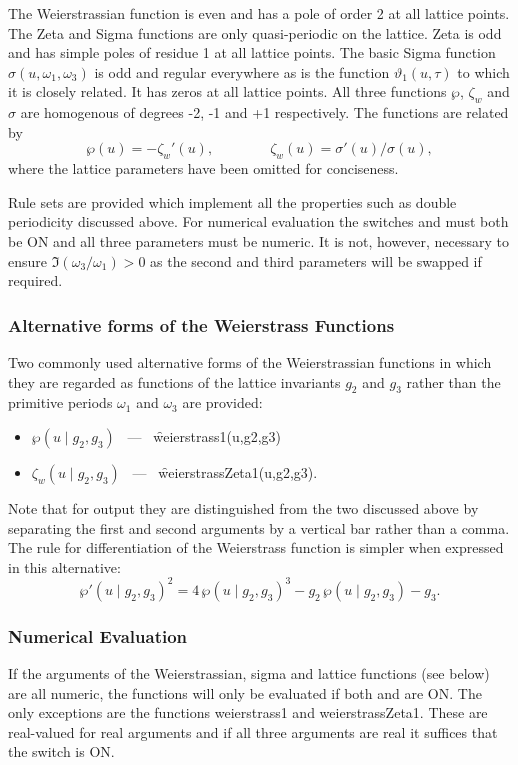 The Weierstrassian function is even and has a pole of order 2 at all lattice points.
The Zeta and Sigma functions are only quasi-periodic on the lattice. Zeta is odd and has simple poles of residue
1 at all lattice points. The basic Sigma function $\sigma(u,\omega_1,\omega_3)$ is odd and regular everywhere as is
the function $\vartheta_1(u,\tau)$ to which it is closely related. It has zeros at all lattice points. All three functions
$\wp$, $\zeta_w$ and $\sigma$ are homogenous of degrees -2, -1 and +1 respectively. The functions are related by
\[ \wp(u) = -\zeta_w'(u),\qquad\qquad \zeta_w(u) = \sigma'(u)/\sigma(u),\]
where the lattice parameters have been omitted for conciseness.

Rule sets are provided which implement all the properties such as double periodicity discussed above. For numerical evaluation
the switches  and  must both be ON and all three parameters must be numeric. It is not, however,
necessary to ensure $\Im(\omega_3/\omega_1) >0$ as the second and third parameters will be swapped if required.

\subsubsection{Alternative forms of the Weierstrass Functions}
\hypertarget{WEIERSTRASS1}{}
\hypertarget{WEIERSTRASSZETA1}{}
\hypertarget{operator:WEIERSTRASS1}{}
\hypertarget{operator:WEIERSTRASSZETA1}{}
 

Two commonly used alternative forms of the Weierstrassian functions in which
they are regarded as functions of the lattice invariants $g_2$ and $g_3$
rather than the primitive periods $\omega_1$ and $\omega_3$ are provided:
\begin{itemize}
\item  $\wp(u \mid g_2, g_3)$ \ --- \ \f{weierstrass1(u,g2,g3)}
\item $\zeta_w(u \mid g_2, g_3)$ \ --- \ \f{weierstrassZeta1(u,g2,g3)}.
\end{itemize}
Note that for output they are distinguished from the two discussed above
by separating the first and
second arguments by a vertical bar rather than a comma. The rule for
differentiation of the Weierstrass function is simpler when expressed in
this  alternative:
\[ \wp'(u \mid g_2,g_3)^2 = 4\,\wp(u \mid g_2,g_3)^3
- g_2\, \wp(u \mid g_2,g_3) -g_3. \]

\subsubsection{Numerical Evaluation}
If the arguments of the Weierstrassian, sigma and lattice functions (see below)
are all numeric, the functions will only be evaluated if both  and
 are ON.  The only exceptions are the functions weierstrass1 and
weierstrassZeta1. These are real-valued for real arguments and if all three
arguments are real it suffices that the switch  is ON.

